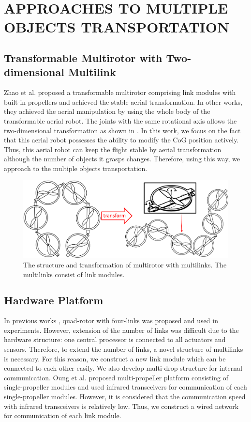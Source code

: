 \section{APPROACHES TO MULTIPLE OBJECTS TRANSPORTATION}
\subsection{Transformable Multirotor with Two-dimensional Multilink}
Zhao et al.\cite{Zhao2016} proposed a transformable multirotor comprising link modules with built-in propellers and achieved the stable aerial transformation. In other works\cite{ZhaoISER2016}\cite{ZhaoICRA2017}, they achieved the aerial manipulation by using the whole body of the transformable aerial robot. The joints with the same rotational axis allows the two-dimensional transformation as shown in . In this work, we focus on the fact that this aerial robot possesses the ability to modify the CoG position actively. Thus, this aerial robot can keep the flight stable by aerial transformation although the number of objects it grasps changes. Therefore, using this way, we approach to the multiple objects transportation.
\begin{figure}[t]
  \begin{center}
    \includegraphics[width=1.0\columnwidth]{figs/multilink.pdf}
  \end{center}
  \caption{The structure and transformation of multirotor with multilinks. The multilinks consist of link modules.\label{figure:multi_link}}
\end{figure}
   
\subsection{Hardware Platform}
In previous works \cite{ZhaoISER2016}\cite{ZhaoICRA2017}\cite{Zhao2016}, quad-rotor with four-links was proposed and used in experiments. However, extension of the number of links was difficult due to the hardware structure: one central processor is connected to all actuators and sensors. Therefore, to extend the number of links, a novel structure of multilinks is necessary. For this reason, we construct a new link module which can be connected to each other easily. We also develop multi-drop structure for internal communication. Oung et al.\cite{Oung2010} proposed multi-propeller platform consisting of single-propeller modules and used infrared transceivers for communication of each single-propeller modules. However, it is considered that the communication speed with infrared transceivers is relatively low. Thus, we construct a wired network for communication of each link module. 

